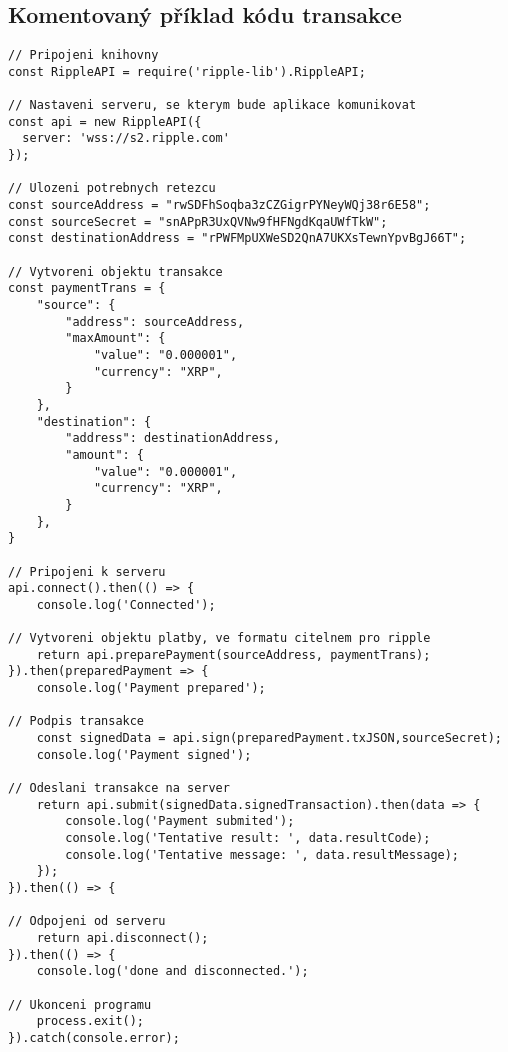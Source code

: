 \documentclass[hidelinks, titlepage]{article}
\begin{document}
\subsection{Komentovaný příklad kódu transakce}
\begin{lstlisting}
// Pripojeni knihovny
const RippleAPI = require('ripple-lib').RippleAPI;

// Nastaveni serveru, se kterym bude aplikace komunikovat
const api = new RippleAPI({
  server: 'wss://s2.ripple.com'
});

// Ulozeni potrebnych retezcu
const sourceAddress = "rwSDFhSoqba3zCZGigrPYNeyWQj38r6E58";
const sourceSecret = "snAPpR3UxQVNw9fHFNgdKqaUWfTkW";
const destinationAddress = "rPWFMpUXWeSD2QnA7UKXsTewnYpvBgJ66T";

// Vytvoreni objektu transakce
const paymentTrans = {
    "source": {
        "address": sourceAddress,
        "maxAmount": {
            "value": "0.000001",
            "currency": "XRP",
        }
    },
    "destination": {
        "address": destinationAddress,
        "amount": {
            "value": "0.000001",
            "currency": "XRP",
        }
    },
}

// Pripojeni k serveru
api.connect().then(() => {
    console.log('Connected');

// Vytvoreni objektu platby, ve formatu citelnem pro ripple
	return api.preparePayment(sourceAddress, paymentTrans);
}).then(preparedPayment => {
    console.log('Payment prepared');

// Podpis transakce
	const signedData = api.sign(preparedPayment.txJSON,sourceSecret);
    console.log('Payment signed');

// Odeslani transakce na server
	return api.submit(signedData.signedTransaction).then(data => {
        console.log('Payment submited');
		console.log('Tentative result: ', data.resultCode);
        console.log('Tentative message: ', data.resultMessage);
    });
}).then(() => {

// Odpojeni od serveru
	return api.disconnect();
}).then(() => {
    console.log('done and disconnected.');

// Ukonceni programu
    process.exit();
}).catch(console.error);
\end{lstlisting}
\end{document}
